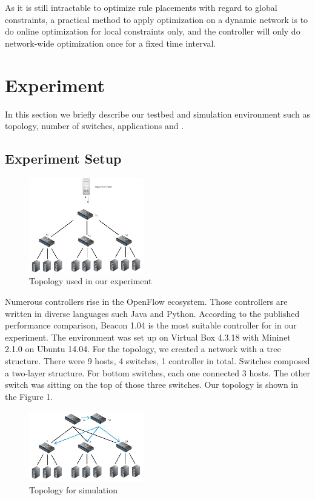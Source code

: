 \documentclass[10pt,twocolumn,letterpaper]{article}
\begin{document}
As it is still intractable to optimize rule placements with regard to global constraints, a practical method to apply optimization on a dynamic network is to do online optimization for local constraints only, and the controller will only do network-wide optimization once for a fixed time interval. 

\section{Experiment} \label{sec:exp}
In this section we briefly describe our testbed and simulation environment such as topology, number of switches, applications and \etc. 

\subsection{Experiment Setup}

\begin{figure}[ht!]
\centering
\includegraphics[width=50mm]{Topology.jpg}
\caption{Topology used in our experiment\label{overflow}}
\end{figure}

Numerous controllers rise in the OpenFlow ecosystem. Those controllers are written in diverse languages such Java and Python. According to the published performance comparison, Beacon 1.04 is the most suitable controller for in our experiment. The environment was set up on Virtual Box 4.3.18 with Mininet 2.1.0 on Ubuntu 14.04. For the topology, we created a network with a tree structure. There were 9 hosts, 4 switches, 1 controller in total. Switches composed a two-layer structure. For bottom switches, each one connected 3 hosts. The other switch was sitting on the top of those three switches. Our topology is shown in the Figure 1.

\begin{figure}[ht!]
\centering
\includegraphics[width=50mm]{TopologyMultilevel.jpg}
\caption{Topology for simulation \label{overflow}}
\end{figure}
\end{document}
